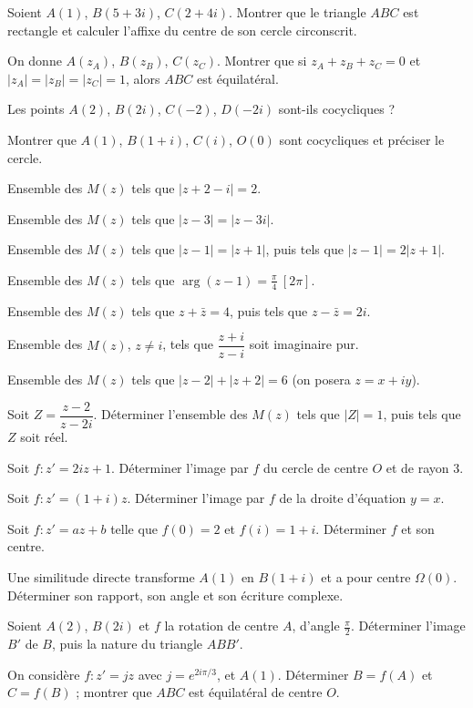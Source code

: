 \exo{} Soient $A(1)$, $B(5+3i)$, $C(2+4i)$. Montrer que le triangle $ABC$ est rectangle et
calculer l'affixe du centre de son cercle circonscrit.

\exo{} On donne $A(z_A)$, $B(z_B)$, $C(z_C)$. Montrer que si $z_A+z_B+z_C=0$ et
$|z_A|=|z_B|=|z_C|=1$, alors $ABC$ est équilatéral.

\exo{} Les points $A(2)$, $B(2i)$, $C(-2)$, $D(-2i)$ sont-ils cocycliques ?

\exo{} Montrer que $A(1)$, $B(1+i)$, $C(i)$, $O(0)$ sont cocycliques et préciser le cercle.

\exo{} Ensemble des $M(z)$ tels que $|z+2-i|=2$.

\exo{} Ensemble des $M(z)$ tels que $|z-3|=|z-3i|$.

\exo{} Ensemble des $M(z)$ tels que $|z-1|=|z+1|$, puis tels que $|z-1|=2|z+1|$.

\exo{} Ensemble des $M(z)$ tels que $\arg(z-1)=\frac\pi4\ [2\pi]$.

\exo{} Ensemble des $M(z)$ tels que $z+\bar z=4$, puis tels que $z-\bar z=2i$.

\exo{} Ensemble des $M(z)$, $z\neq i$, tels que $\dfrac{z+i}{z-i}$ soit imaginaire pur.

\exo{} Ensemble des $M(z)$ tels que $|z-2|+|z+2|=6$ (on posera $z=x+iy$).

\exo{} Soit $Z=\dfrac{z-2}{z-2i}$. Déterminer l'ensemble des $M(z)$ tels que $|Z|=1$, puis
tels que $Z$ soit réel.

\exo{} Soit $f:z'=2iz+1$. Déterminer l'image par $f$ du cercle de centre $O$ et de rayon $3$.

\exo{} Soit $f:z'=(1+i)z$. Déterminer l'image par $f$ de la droite d'équation $y=x$.

\exo{} Soit $f:z'=az+b$ telle que $f(0)=2$ et $f(i)=1+i$. Déterminer $f$ et son centre.

\exo{} Une similitude directe transforme $A(1)$ en $B(1+i)$ et a pour centre $\Omega(0)$.
Déterminer son rapport, son angle et son écriture complexe.

\exo{} Soient $A(2)$, $B(2i)$ et $f$ la rotation de centre $A$, d'angle $\frac\pi2$.
Déterminer l'image $B'$ de $B$, puis la nature du triangle $ABB'$.

\exo{} On considère $f:z'=jz$ avec $j=e^{2i\pi/3}$, et $A(1)$. Déterminer $B=f(A)$ et
$C=f(B)$ ; montrer que $ABC$ est équilatéral de centre $O$.

